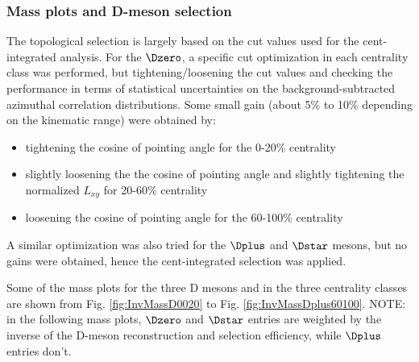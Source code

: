 \subsubsection{Mass plots and D-meson selection}
The topological selection is largely based on the cut values used for the cent-integrated analysis.
For the $\Dzero$, a specific cut optimization in each centrality class was performed, but tightening/loosening the cut values and checking the performance in terms of statistical uncertainties on the background-subtracted azimuthal correlation distributions.
Some small gain (about 5\% to 10\% depending on the kinematic range) were obtained by:
\begin{itemize}
  \item tightening the cosine of pointing angle for the 0-20\% centrality
  \item slightly loosening the the cosine of pointing angle and slightly tightening the normalized $L_{xy}$  for 20-60\% centrality
  \item loosening the cosine of pointing angle for the 60-100\% centrality
\end{itemize}
A similar optimization was also tried for the $\Dplus$ and $\Dstar$ mesons, but no gains were obtained, hence the cent-integrated selection was applied.

Some of the mass plots for the three D mesons and in the three centrality classes are shown from Fig. \ref{fig:InvMassD0020} to Fig. \ref{fig:InvMassDplus60100}.
NOTE: in the following mass plots, $\Dzero$ and $\Dstar$ entries are weighted by the inverse of the D-meson reconstruction and selection efficiency, while $\Dplus$ entries don't.

